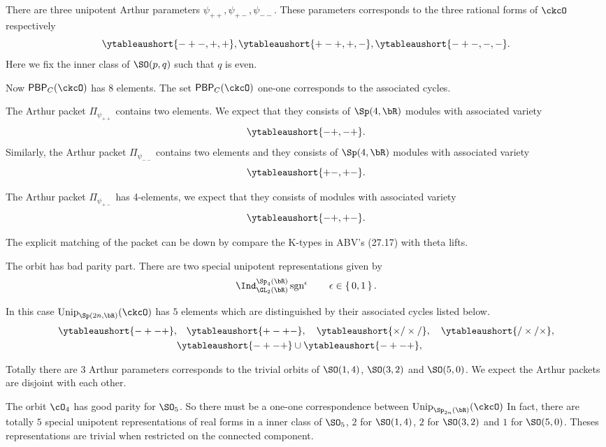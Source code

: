 \documentclass[12pt,a4paper]{amsart}
\let\ytb=\ytableaushort
\newcommand{\sgn}{\operatorname{sgn}}
\numberwithin{equation}{section}
\theoremstyle{remark}
\def\Unip{\mathrm{Unip}}
\def\ppp{\times}
\def\mmm{\slash}
\begin{document}
There are three unipotent Arthur parameters $\psi_{++}, \psi_{+-},\psi_{--}$.
These parameters corresponds to the three rational forms of $\ckcO$ respectively
\[
\ytb{-+-,+,+}, \ytb{+-+,+,-},\ytb{-+-,-,-}.
\]
Here we fix the inner class of $\SO(p,q)$ such that $q$ is even.

Now $\PBP_{C}(\ckcO)$  has $8$ elements.
The set $\PBP_{C}(\ckcO)$ one-one corresponds to the associated cycles.

The Arthur packet $\Pi_{\psi_{++}}$ contains two elements.
We expect that they consists of $\Sp(4,\bR)$ modules with associated variety
\[
  \ytb{-+,-+}.
\]
Similarly,
the Arthur packet $\Pi_{\psi_{--}}$ contains two elements and
they consists of $\Sp(4,\bR)$ modules with associated variety
\[
  \ytb{+-,+-}.
\]

The Arthur packet $\Pi_{\psi_{+-}}$ has 4-elements, we expect that
they consists of modules with associated variety
\[
  \ytb{-+,+-}.
\]

The explicit matching of the packet can be down by compare the K-types
in ABV's (27.17) with theta lifts.


The orbit has bad parity part. There are two special unipotent representations given
by %
\[
\Ind_{\GL_{2}(\bR)}^{\Sp_{4}(\bR)} \sgn^{\epsilon} \qquad \epsilon \in \set{0,1}.
\]


In this case $\Unip_{\Sp(2n,\bR)}(\ckcO)$ has $5$ elements which are
distinguished by  their associated cycles listed below.
\[
  \begin{split}
  \ytb{-+-+},& \quad
  \ytb{+-+-},\quad
  \ytb{\ppp\mmm\ppp\mmm},\quad
  \ytb{\mmm\ppp\mmm\ppp}, \\
  & \ytb{-+-+}\cup
  \ytb{-+-+},\quad
  \end{split}
\]

Totally there are $3$ Arthur parameters corresponds to
the trivial orbits of $\SO(1,4)$, $\SO(3,2)$ and $\SO(5,0)$.
We expect the Arthur packets are disjoint with each other.


The orbit $\cO_{4}$ has good parity for $\SO_{5}$.
So there must be a one-one correspondence between $\Unip_{\Sp_{2n}(\bR)}(\ckcO)$
In fact, there are totally $5$ special
unipotent representations of real forms in a inner class of $\SO_{5}$,
$2$ for $\SO(1,4)$, $2$ for $\SO(3,2)$ and $1$ for $\SO(5,0)$.
Theses representations are trivial when restricted on the connected component.
\end{document}
